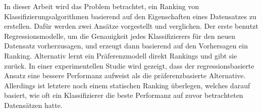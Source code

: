 In dieser Arbeit wird das Problem betrachtet, ein Ranking von Klassifizierungsalgorithmen basierend auf den Eigenschaften eines Datensatzes zu erstellen. Dafür werden zwei Ansätze vorgestellt und verglichen. Der erste benutzt Regressionsmodelle,  um die Genauigkeit jedes Klassifizierers für den neuen Datensatz vorherzusagen, und erzeugt dann basierend auf den Vorhersagen ein Ranking. Alternativ lernt ein Präferenzmodell direkt Rankings und gibt sie zurück. In einer experimentellen Studie wird gezeigt, dass der regressionsbasierte Ansatz eine bessere Performanz aufweist als die präferenzbasierte Alternative. Allerdings ist letztere noch einem statischen Ranking überlegen, welches darauf basiert, wie oft ein Klassifizierer die beste Performanz auf zuvor betrachteten Datensätzen hatte. 

